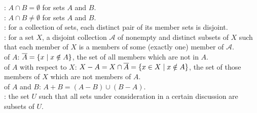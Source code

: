 \documentclass[12pt]{book}
\begin{document}
: $A \cap B = \emptyset$ for sets $A$ and $B$.\\
: $A \cap B \neq \emptyset$ for sets $A$ and $B$.\\
: for a collection of sets, each distinct pair of its member sets is disjoint.\\
: for a set $X$, a disjoint collection $\mathcal{A}$ of nonempty and distinct subsets of $X$ such that each member of $X$ is a members of some (exactly one) member of $\mathcal{A}$.\\
 of $A$: $\overline{A} = \{x \mid x \notin A\}$, the set of all members which are not in $A$.\\
 of $A$ with respect to $X$: $X - A = X \cap \overline{A} = \{x \in X \mid x \notin A\}$, the set of those members of $X$ which are not members of $A$.\\
 of $A$ and $B$: $A + B = (A - B) \cup (B - A)$.\\
: the set $U$ such that all sets under consideration in a certain discussion are subsets of $U$.\\

\newpage
\end{document}
